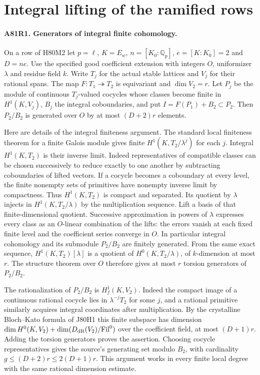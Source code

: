 \section{Integral lifting of the ramified rows}

\paragraph{A81R1. Generators of integral finite cohomology.}
On a row of H80M2 let $p=\ell$, $K=E_w$, $n=[K_0:\mathbb Q_p]$,
$e=[K:K_0]=2$ and $D=ne$. Use the specified good coefficient
extension with integers $O$, uniformizer $\lambda$ and residue
field $k$. Write $T_j$ for the actual stable lattices and $V_j$
for their rational spans. The map $F:T_1\twoheadrightarrow T_2$
is equivariant and $\dim V_2=r$. Let $P_j$ be the module of
continuous $T_j$-valued cocycles whose classes become finite in
$H^1(K,V_j)$, $B_j$ the integral coboundaries, and put
$I=F(P_1)+B_2\subset P_2$. Then $P_2/B_2$ is generated over
$O$ by at most $(D+2)r$ elements.

Here are details of the integral finiteness argument. The standard
local finiteness theorem for a finite Galois module gives finite
$H^1(K,T_2/\lambda^j)$ for each $j$. Integral $H^1(K,T_2)$
is their inverse limit. Indeed representatives of compatible
classes can be chosen successively to reduce exactly to one
another by subtracting coboundaries of lifted vectors.
If a cocycle becomes a coboundary at every level, the finite
nonempty sets of primitives have nonempty inverse limit by compactness.
Thus $H^1(K,T_2)$ is compact and separated. Its quotient by
$\lambda$ injects in $H^1(K,T_2/\lambda)$ by the multiplication
sequence. Lift a basis of that finite-dimensional quotient.
Successive approximation in powers of $\lambda$ expresses every
class as an $O$-linear combination of the lifts: the errors vanish
at each fixed finite level and the coefficient series converge in $O$.
In particular integral cohomology and its submodule $P_2/B_2$ are
finitely generated. From the same exact sequence,
$H^1(K,T_2)[\lambda]$ is a quotient of $H^0(K,T_2/\lambda)$,
of $k$-dimension at most $r$. The structure theorem over $O$
therefore gives at most $r$ torsion generators of $P_2/B_2$.

The rationalization of $P_2/B_2$ is $H^1_f(K,V_2)$.
Indeed the compact image of a continuous rational cocycle lies in
$\lambda^{-j}T_2$ for some $j$, and a rational primitive similarly
acquires integral coordinates after multiplication. By the crystalline
Bloch--Kato formula of J80H1 this finite subspace has dimension
$\dim H^0(K,V_2)+\dim(D_{\rm dR}(V_2)/\mathrm{Fil}^0)$ over the
coefficient field, at most $(D+1)r$. Adding the torsion generators
proves the assertion. Choosing cocycle representatives gives the
source's generating set modulo $B_2$, with cardinality
$g\le(D+2)r\le2(D+1)r$. This argument works in every finite
local degree with the same rational dimension estimate.

